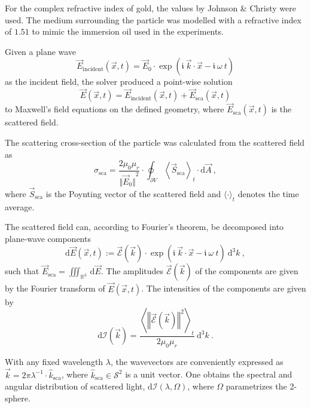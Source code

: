 \documentclass[10pt]{article}
\begin{document}
For the complex refractive index of gold, the values by Johnson \& Christy \cite{Johnson1972} were used. 
The medium surrounding the particle was modelled with a refractive index of $1.51$ to mimic the immersion oil used in the experiments. 

Given a plane wave 
$$
    \vec{E}_\mathrm{incident}(\vec{x},t) = \vec{E}_0 \cdot \exp\!\left( \mathfrak{i}\ \vec{k}\cdot\vec{x} - \mathfrak{i}\ \omega\ t \right)
$$
as the incident field, the solver produced a point-wise solution 
$$
    \vec{E}(\vec{x},t) = \vec{E}_\mathrm{incident}(\vec{x},t) + \vec{E}_\mathrm{sca}(\vec{x},t)
$$ 
to Maxwell's field equations on the defined geometry, where $\vec{E}_\mathrm{sca}(\vec{x},t)$ is the scattered field. 

The scattering cross-section of the particle was calculated from the scattered field as 
$$
    \sigma_\mathrm{sca} = \frac{2 \mu_0 \mu_r}{ {\bigl\Vert \vec{E}_0 \bigr\Vert}^2 } \cdot \oint_{\partial V} {\left\langle \vec{S}_\mathrm{sca} \right\rangle}_t \cdot\mathrm{d}\vec{A} \ ,
$$
where $\vec{S}_\mathrm{sca}$ is the Poynting vector of the scattered field and $\langle\cdot\rangle_t$ denotes the time average. 

The scattered field can, according to Fourier's theorem, be decomposed into plane-wave components
$$
    \mathrm{d}\vec{E}(\vec{x},t) := \vec{\mathcal{E}}(\vec{k}) 
    \cdot 
    \exp{\!\left(\mathfrak{i}\ \vec{k}\cdot\vec{x} - \mathfrak{i}\ \omega\ t \right)}
    \ \mathrm{d}^3 k
    \ , 
$$
such that $ \vec{E}_\mathrm{sca} = \iiint_{\mathds{R}^3}\,\mathrm{d}\vec{E}$. 
The amplitudes $\vec{\mathcal{E}}(\vec{k})$ of the components are given by the Fourier transform of $\vec{E}(\vec{x},t)$. 
The intensities of the components are given by \cite{Griffiths-ED,MA} 
$$
    \mathrm{d}\mathcal{I}(\vec{k}) = \frac{ {\left\langle {\left\Vert \vec{\mathcal{E}}(\vec{k}) \right\Vert}^2 \right\rangle}_t }{ 2\mu_0 \mu_r } \ \mathrm{d}^3k
    \ .
$$

With any fixed wavelength $\lambda$, the wavevectors are conveniently expressed as $ \vec{k} = 2 \pi \lambda^{-1} \cdot \hat{k}_\mathrm{sca} $, where \mbox{$\hat{k}_\mathrm{sca} \in \mathcal{S}^2$} is a unit vector. 
One obtains the spectral and angular distribution of scattered light, $\mathrm{d}\mathcal{I}(\lambda, \Omega)$, where $\Omega$ parametrizes the 2-sphere. 

\end{document}
